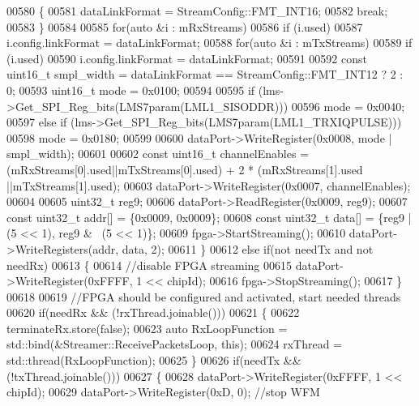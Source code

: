 \begin{DoxyCode}
00580             \{
00581                 dataLinkFormat = StreamConfig::FMT_INT16;
00582                 \textcolor{keywordflow}{break};
00583             \}
00584 
00585         \textcolor{keywordflow}{for}(\textcolor{keyword}{auto} &i : mRxStreams)
00586             \textcolor{keywordflow}{if} (i.used)
00587                 i.config.linkFormat = dataLinkFormat;
00588         \textcolor{keywordflow}{for}(\textcolor{keyword}{auto} &i : mTxStreams)
00589             \textcolor{keywordflow}{if} (i.used)
00590                 i.config.linkFormat = dataLinkFormat;
00591 
00592         \textcolor{keyword}{const} uint16\_t smpl\_width = dataLinkFormat == StreamConfig::FMT_INT12 ? 2 : 0;
00593         uint16\_t mode = 0x0100;
00594 
00595         \textcolor{keywordflow}{if} (lms->Get_SPI_Reg_bits(LMS7param(LML1\_SISODDR)))
00596             mode = 0x0040;
00597         \textcolor{keywordflow}{else} \textcolor{keywordflow}{if} (lms->Get_SPI_Reg_bits(LMS7param(LML1\_TRXIQPULSE)))
00598             mode = 0x0180;
00599 
00600         dataPort->WriteRegister(0x0008, mode | smpl\_width);
00601 
00602         \textcolor{keyword}{const} uint16\_t channelEnables = (mRxStreams[0].used||mTxStreams[0].used) + 2 * (mRxStreams[1].used
      ||mTxStreams[1].used);
00603         dataPort->WriteRegister(0x0007, channelEnables);
00604 
00605         uint32\_t reg9;
00606         dataPort->ReadRegister(0x0009, reg9);
00607         \textcolor{keyword}{const} uint32\_t addr[] = \{0x0009, 0x0009\};
00608         \textcolor{keyword}{const} uint32\_t data[] = \{reg9 | (5 << 1), reg9 & ~(5 << 1)\};
00609         fpga->StartStreaming();
00610         dataPort->WriteRegisters(addr, data, 2);
00611     \}
00612     \textcolor{keywordflow}{else} \textcolor{keywordflow}{if}(not needTx and not needRx)
00613     \{
00614         \textcolor{comment}{//disable FPGA streaming}
00615         dataPort->WriteRegister(0xFFFF, 1 << chipId);
00616         fpga->StopStreaming();
00617     \}
00618 
00619     \textcolor{comment}{//FPGA should be configured and activated, start needed threads}
00620     \textcolor{keywordflow}{if}(needRx && (!rxThread.joinable()))
00621     \{
00622         terminateRx.store(\textcolor{keyword}{false});
00623         \textcolor{keyword}{auto} RxLoopFunction = std::bind(&Streamer::ReceivePacketsLoop, \textcolor{keyword}{this});
00624         rxThread = std::thread(RxLoopFunction);
00625     \}
00626     \textcolor{keywordflow}{if}(needTx && (!txThread.joinable()))
00627     \{
00628         dataPort->WriteRegister(0xFFFF, 1 << chipId);
00629         dataPort->WriteRegister(0xD, 0); \textcolor{comment}{//stop WFM}

\end{DoxyCode}
